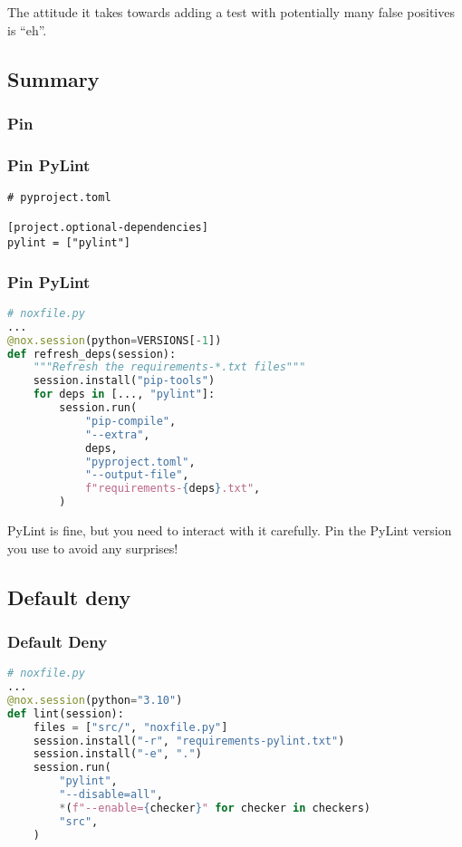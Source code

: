 \documentclass{article}
\begin{document}
The attitude it takes towards adding a test with potentially many false
positives is ``eh''.

\hypertarget{summary}{%
\subsection{Summary}\label{summary}}

\hypertarget{pin}{%
\subsubsection{Pin}\label{pin}}

\begin{frame}[fragile]
\frametitle{Pin PyLint}

\begin{lstlisting}
# pyproject.toml

[project.optional-dependencies]
pylint = ["pylint"]
\end{lstlisting}

\end{frame}

\begin{frame}[fragile]
\frametitle{Pin PyLint}

\begin{lstlisting}[language=Python]
# noxfile.py
...
@nox.session(python=VERSIONS[-1])
def refresh_deps(session):
    """Refresh the requirements-*.txt files"""
    session.install("pip-tools")
    for deps in [..., "pylint"]:
        session.run(
            "pip-compile",
            "--extra",
            deps,
            "pyproject.toml",
            "--output-file",
            f"requirements-{deps}.txt",
        )
\end{lstlisting}

\end{frame}

PyLint is fine, but you need to interact with it carefully. Pin the
PyLint version you use to avoid any surprises!

\hypertarget{default-deny}{%
\subsection{Default deny}\label{default-deny}}

\begin{frame}[fragile]
\frametitle{Default Deny}

\begin{lstlisting}[language=Python]
# noxfile.py
...
@nox.session(python="3.10")
def lint(session):
    files = ["src/", "noxfile.py"]
    session.install("-r", "requirements-pylint.txt")
    session.install("-e", ".")
    session.run(
        "pylint",
        "--disable=all",
        *(f"--enable={checker}" for checker in checkers)
        "src",
    )
\end{lstlisting}

\end{frame}
\end{document}
